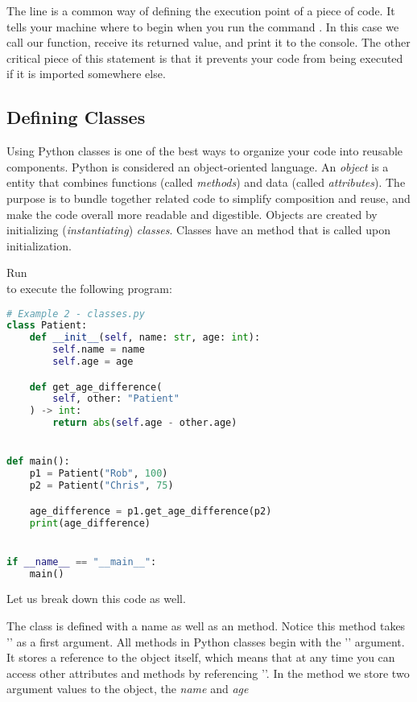 The line  is a common way of defining the execution point of a piece of code.
It tells your machine where to begin when you run the command . In this case we call our function, receive its returned value, and print it to the console. The other critical piece of this statement is that it prevents your code from being executed if it is imported somewhere else.

\subsection{Defining Classes}

Using Python classes is one of the best ways to organize your code into reusable components.
Python is considered an object-oriented language.
An \textit{object} is a entity that combines functions (called \textit{methods}) and data (called \textit{attributes}).
The purpose is to bundle together related code to simplify composition and reuse, and make the code overall more readable and digestible.
Objects are created by initializing (\textit{instantiating}) \textit{classes}.
Classes have an  method that is called upon initialization.

Run \\ to execute the following program:

\begin{lstlisting}[language=Python]
# Example 2 - classes.py
class Patient:
    def __init__(self, name: str, age: int):
        self.name = name
        self.age = age

    def get_age_difference(
        self, other: "Patient"
    ) -> int:
        return abs(self.age - other.age)


def main():
    p1 = Patient("Rob", 100)
    p2 = Patient("Chris", 75)

    age_difference = p1.get_age_difference(p2)
    print(age_difference)


if __name__ == "__main__":
    main()

\end{lstlisting}

Let us break down this code as well.

The class is defined with a name as well as an  method.
Notice this method takes '' as a first argument.
All methods in Python classes begin with the '' argument.
It stores a reference to the object itself, which means that at any time you can access other attributes and methods by referencing ''.
In the  method we store two argument values to the object, the \textit{name} and \textit{age}


